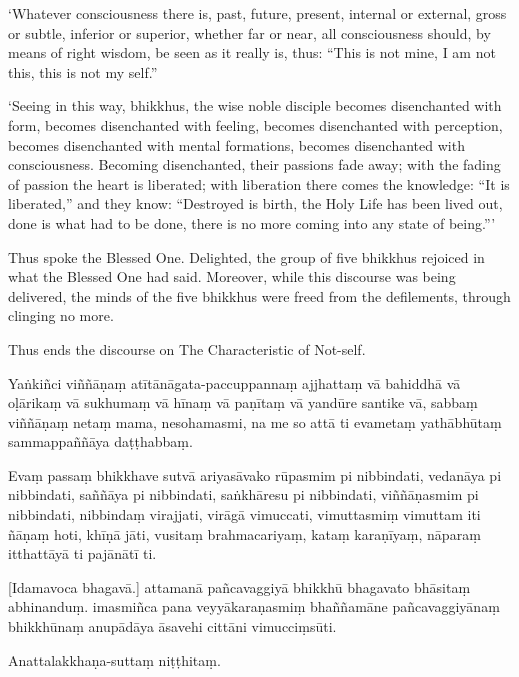 \clearpage

\englishText
\markboth{\englishTitle}{\rightmark}

‘Whatever consciousness there is, past, future, present, internal or
external, gross or subtle, inferior or superior, whether far or near,
all consciousness should, by means of right wisdom, be seen as it really
is, thus: “This is not mine, I am not this, this is not my self.”

‘Seeing in this way, bhikkhus, the wise noble disciple becomes
disenchanted with form, becomes disenchanted with feeling, becomes
disenchanted with perception, becomes disenchanted with mental
formations, becomes disenchanted with consciousness. Becoming
disenchanted, their passions fade away; with the fading of passion the
heart is liberated; with liberation there comes the knowledge: “It is
liberated,” and they know: “Destroyed is birth, the Holy Life has been
lived out, done is what had to be done, there is no more coming into any
state of being.”\thinspace ’

Thus spoke the Blessed One. Delighted, the group of five bhikkhus
rejoiced in what the Blessed One had said. Moreover, while this discourse was
being delivered, the minds of the five bhikkhus were freed from the
defilements, through clinging no more.

Thus ends the discourse on The Characteristic of Not-self.

\clearpage

\paliText
\markboth{\paliTitle}{\rightmark}

Yaṅkiñci viññāṇaṃ atītānāgata-paccuppannaṃ ajjhattaṃ vā bahiddhā vā
oḷārikaṃ vā sukhumaṃ vā hīnaṃ vā paṇītaṃ vā yandūre santike vā, sabbaṃ
viññāṇaṃ netaṃ mama, nesohamasmi, na me so attā ti evametaṃ yathābhūtaṃ
sammappaññāya daṭṭhabbaṃ.

Evaṃ passaṃ bhikkhave sutvā ariyasāvako rūpasmim pi nibbindati, vedanāya
pi nibbindati, saññāya pi nibbindati, saṅkhāresu pi nibbindati,
viññāṇasmim pi nibbindati, nibbindaṃ virajjati, virāgā vimuccati,
vimuttasmiṃ vimuttam iti ñāṇaṃ hoti, khīṇā jāti, vusitaṃ brahmacariyaṃ,
kataṃ karaṇīyaṃ, nāparaṃ itthattāyā ti pajānātī ti.


[Idamavoca bhagavā.] attamanā pañcavaggiyā bhikkhū bhagavato bhāsitaṃ
abhinanduṃ. imasmiñca pana veyyākaraṇasmiṃ bhaññamāne pañcavaggiyānaṃ
bhikkhūnaṃ anupādāya āsavehi cittāni vimucciṃsūti.

Anattalakkhaṇa-suttaṃ niṭṭhitaṃ.

